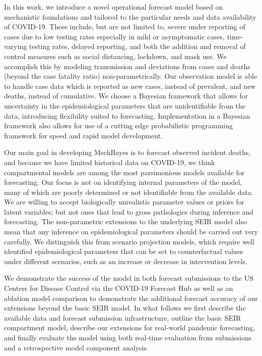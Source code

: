\documentclass{umassthesis}          %
\begin{document}
In this work, we introduce a novel operational forecast model based on mechanistic foundations and tailored to the particular needs and data availability of COVID-19. These include, but are not limited to, severe under reporting of cases due to low testing rates especially in mild or asymptomatic cases, time-varying testing rates, delayed reporting, and both the addition and removal of control measures such as social distancing, lockdown, and mask use. We accomplish this by modeling transmission and deviations from cases and deaths (beyond the case fatality ratio) non-parametrically. Our observation model is able to handle case data which is reported as new cases, instead of prevalent, and new deaths, instead of cumulative. We choose a Bayesian framework that allows for uncertainty in the epidemiological parameters that are unidentifiable from the data, introducing flexibility suited to forecasting. Implementation in a Bayesian framework also allows for use of a cutting edge probabilistic programming framework for speed and rapid model development. 

Our main goal in developing MechBayes is to forecast observed incident deaths, and because we have limited historical data on COVID-19, we think compartmental models are among the most parsimonious models available for forecasting. Our focus is not on identifying internal parameters of the model, many of which are poorly determined or not identifiable from the available data. We are willing to accept biologically unrealistic parameter values or priors for latent variables; but not ones that lead to gross pathologies during inference and forecasting. The non-parametric extensions to the underlying SEIR model also mean that any inference on epidemiological parameters should be carried out very carefully. We distinguish this from scenario projection models, which require well identified epidemiological parameters that can be set to counterfactual values under different scenarios, such as an increase or decrease in intervention levels. 


 We demonstrate the success of the model in both forecast submissions to the US Centers for Disease Control via the COVID-19 Forecast Hub as well as an ablation model comparison to demonstrate the additional forecast accuracy of our extensions beyond the basic SEIR model. In what follows we first describe the available data and forecast submission infrastructure, outline the basic SEIR compartment model, describe our extensions for real-world pandemic forecasting, and finally evaluate the model using both real-time evaluation from submissions and a retrospective model component analysis. 
\end{document}
